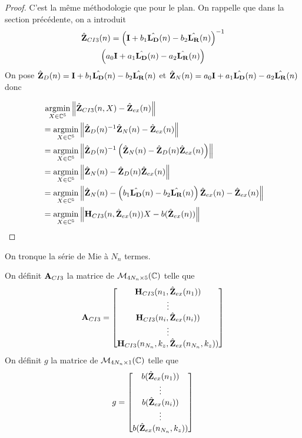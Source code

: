     \begin{proof}
      C'est la même méthodologie que pour le plan.
      On rappelle que dans la section précédente, on a introduit
      \begin{multline*}
        \hat{\mathbf{Z}}_{CI3}(n) = \left(\mathbf{I} + b_1 \hat{\mathbf{L_D}}(n) - b_2 \hat{\mathbf{L_R}}(n) \right)^{-1}\\\left(a_0 \mathbf{I} + a_1 {\hat{\mathbf{L_D}}(n)} - a_2 {\hat{\mathbf{L_R}}(n)}\right)
      \end{multline*}
      On pose \(\hat{\mathbf{Z}}_D(n) = \mathbf{I} + b_1 \hat{\mathbf{L_D}}(n) - b_2 \hat{\mathbf{L_R}}(n)\) et \(\hat{\mathbf{Z}}_N(n) = a_0 \mathbf{I} + a_1 {\hat{\mathbf{L_D}}(n)} - a_2 {\hat{\mathbf{L_R}}(n)}\) donc

      \begin{align*}
      &{}~ {\underset{X\in\mathbb C^5}{\operatorname{argmin}}} \left\lVert\hat{\mathbf{Z}}_{CI3}(n,X) - \hat{\mathbf{Z}}_{ex}(n)\right\rVert
      \\
      & = {\underset{X\in\mathbb C^5}{\operatorname{argmin}}} \left\lVert\hat{\mathbf{Z}}_D(n)^{-1}\hat{\mathbf{Z}}_N(n) - \hat{\mathbf{Z}}_{ex}(n) \right\rVert
      \\
      &= {\underset{X\in\mathbb C^5}{\operatorname{argmin}}} \left\lVert\hat{\mathbf{Z}}_D(n)^{-1}\left(\hat{\mathbf{Z}}_N(n) - \hat{\mathbf{Z}}_D(n)\hat{\mathbf{Z}}_{ex}(n)\right) \right\rVert
      \\
      &= {\underset{X\in\mathbb C^5}{\operatorname{argmin}}} \left\lVert\hat{\mathbf{Z}}_N(n) - \hat{\mathbf{Z}}_D(n)\hat{\mathbf{Z}}_{ex}(n)\right\rVert
      \\
      &= {\underset{X\in\mathbb C^5}{\operatorname{argmin}}} \left\lVert\hat{\mathbf{Z}}_N(n) - \left(b_1 \hat{\mathbf{L_D}}(n) - b_2 \hat{\mathbf{L_R}}(n)\right)\hat{\mathbf{Z}}_{ex}(n) - \hat{\mathbf{Z}}_{ex}(n) \right\rVert
      \\
      &= {\underset{X\in\mathbb C^5}{\operatorname{argmin}}} \left\lVert\mathbf{H}_{CI3}(n,\hat{\mathbf{Z}}_{ex}(n))X - b(\hat{\mathbf{Z}}_{ex}(n))\right\rVert
      \end{align*}
    \end{proof}

    On tronque la série de Mie à \(N_{n}\) termes.
    \begin{defn}
      On définit \(\mathbf{A}_{CI3}\) la matrice de \(\mathcal{M}_{4N_{n}\times5}(\mathbb C)\) telle que
      \begin{equation*}
        \mathbf{A}_{CI3} = 
        \begin{bmatrix}
          \mathbf{H}_{CI3}(n_1,\hat{\mathbf{Z}}_{ex}(n_1))
          \\
          \vdots
          \\
          \mathbf{H}_{CI3}(n_i,\hat{\mathbf{Z}}_{ex}(n_i))
          \\
          \vdots
          \\
          \mathbf{H}_{CI3}(n_{N_n},k_{z},\hat{\mathbf{Z}}_{ex}(n_{N_n},k_{z}))
        \end{bmatrix}
      \end{equation*}
      On définit \(g\) la matrice de \(\mathcal{M}_{4N_{n}\times1}(\mathbb C)\) telle que
      \begin{equation*}
        g = 
        \begin{bmatrix}
          b(\hat{\mathbf{Z}}_{ex}(n_1))
          \\
          \vdots
          \\
          b(\hat{\mathbf{Z}}_{ex}(n_i))
          \\
          \vdots
          \\
          b(\hat{\mathbf{Z}}_{ex}(n_{N_n},k_{z}))
        \end{bmatrix}
      \end{equation*}
    \end{defn}

